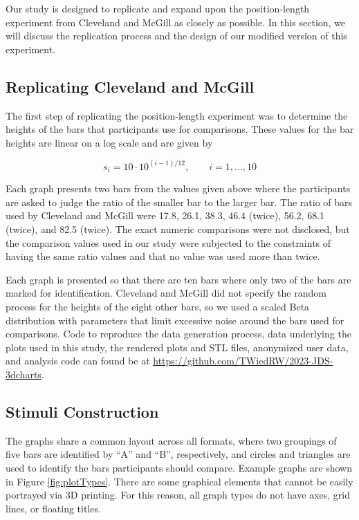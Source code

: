 \documentclass[letterpaper,inpress,dvipsnames]{jdsart}
\begin{document}
Our study is designed to replicate and expand upon the position-length experiment from Cleveland and McGill as closely as possible.
In this section, we will discuss the replication process and the design of our modified version of this experiment.

\hypertarget{replicating-cleveland-and-mcgill}{%
\subsection{Replicating Cleveland and McGill}\label{replicating-cleveland-and-mcgill}}

The first step of replicating the position-length experiment was to determine the heights of the bars that participants use for comparisons.
These values for the bar heights are linear on a log scale and are given by

\[s_i=10\cdot 10^{(i-1)/12}, \qquad i=1,...,10\]

Each graph presents two bars from the values given above where the participants are asked to judge the ratio of the smaller bar to the larger bar. The ratio of bars used by Cleveland and McGill were 17.8, 26.1, 38.3, 46.4 (twice), 56.2, 68.1 (twice), and 82.5 (twice).
The exact numeric comparisons were not disclosed, but the comparison values used in our study were subjected to the constraints of having the same ratio values and that no value was used more than twice.

Each graph is presented so that there are ten bars where only two of the bars are marked for identification.
Cleveland and McGill did not specify the random process for the heights of the eight other bars, so we used a scaled Beta distribution with parameters that limit excessive noise around the bars used for comparisons.
Code to reproduce the data generation process, data underlying the plots used in this study, the rendered plots and STL files, anonymized user data, and analysis code can found be at \url{https://github.com/TWiedRW/2023-JDS-3dcharts}.

\hypertarget{stimuli-construction}{%
\subsection{Stimuli Construction}\label{stimuli-construction}}

The graphs share a common layout across all formats, where two groupings of five bars are identified by ``A'' and ``B'', respectively, and circles and triangles are used to identify the bars participants should compare. Example graphs are shown in
Figure \ref{fig:plotTypes}.
There are some graphical elements that cannot be easily portrayed via 3D printing. For this reason, all graph types do not have axes, grid lines, or floating titles.
\end{document}

